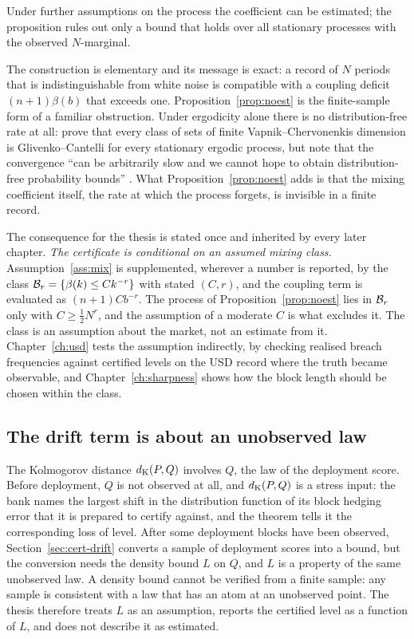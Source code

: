 \documentclass[../../../main.tex]{subfiles}
\begin{document}
Under further assumptions on the process the coefficient can be estimated; the proposition rules out only a bound that holds over all stationary processes with the observed $N$-marginal.

The construction is elementary and its message is exact: a record of $N$ periods that is indistinguishable from white noise is compatible with a coupling deficit $(n+1)\beta(b)$ that exceeds one. Proposition~\ref{prop:noest} is the finite-sample form of a familiar obstruction. Under ergodicity alone there is no distribution-free rate at all: \citet[Thm.~1]{adams2010} prove that every class of sets of finite Vapnik--Chervonenkis dimension is Glivenko--Cantelli for every stationary ergodic process, but note that the convergence ``can be arbitrarily slow and we cannot hope to obtain distribution-free probability bounds'' \citep[Sec.~1.1]{adams2010}. What Proposition~\ref{prop:noest} adds is that the mixing coefficient itself, the rate at which the process forgets, is invisible in a finite record.

The consequence for the thesis is stated once and inherited by every later chapter. \emph{The certificate is conditional on an assumed mixing class.} Assumption~\ref{ass:mix} is supplemented, wherever a number is reported, by the class $\mathcal B_{r}=\{\beta(k)\le Ck^{-r}\}$ with stated $(C,r)$, and the coupling term is evaluated as $(n+1)Cb^{-r}$. The process of Proposition~\ref{prop:noest} lies in $\mathcal B_{r}$ only with $C\ge\tfrac12N^r$, and the assumption of a moderate $C$ is what excludes it. The class is an assumption about the market, not an estimate from it. Chapter~\ref{ch:usd} tests the assumption indirectly, by checking realised breach frequencies against certified levels on the USD record where the truth became observable, and Chapter~\ref{ch:sharpness} shows how the block length should be chosen within the class.

\subsection{The drift term is about an unobserved law}

The Kolmogorov distance $d_{\mathrm{K}}(P,Q)$ involves $Q$, the law of the deployment score. Before deployment, $Q$ is not observed at all, and $d_{\mathrm{K}}(P,Q)$ is a stress input: the bank names the largest shift in the distribution function of its block hedging error that it is prepared to certify against, and the theorem tells it the corresponding loss of level. After some deployment blocks have been observed, Section~\ref{sec:cert-drift} converts a sample of deployment scores into a bound, but the conversion needs the density bound $L$ on $Q$, and $L$ is a property of the same unobserved law. A density bound cannot be verified from a finite sample: any sample is consistent with a law that has an atom at an unobserved point. The thesis therefore treats $L$ as an assumption, reports the certified level as a function of $L$, and does not describe it as estimated.
\end{document}
